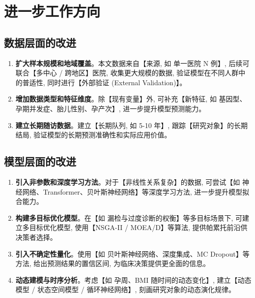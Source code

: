 
\section{进一步工作方向}

\subsection{数据层面的改进}

\begin{enumerate}
  \item \textbf{扩大样本规模和地域覆盖}。本文数据来自【来源, 如 单一医院 N 例】, 后续可联合【多中心 / 跨地区】医院, 收集更大规模的数据, 验证模型在不同人群中的普适性, 同时进行【外部验证 (External Validation)】。

  \item \textbf{增加数据类型和特征维度}。除【现有变量】外, 可补充【新特征, 如 基因型、孕期并发症、胎儿性别、孕产次】, 进一步提升模型预测能力。

  \item \textbf{建立长期随访数据}。建立【长期队列, 如 5-10 年】, 跟踪【研究对象】的长期结局, 验证模型的长期预测准确性和实际应用价值。
\end{enumerate}

\subsection{模型层面的改进}

\begin{enumerate}
  \item \textbf{引入非参数和深度学习方法}。对于【非线性关系复杂】的数据, 可尝试【如 神经网络、Transformer、贝叶斯神经网络】等深度学习方法, 进一步提升模型拟合能力。

  \item \textbf{构建多目标优化模型}。在【如 漏检与过度诊断的权衡】等多目标场景下, 可建立多目标优化模型, 使用【NSGA-II / MOEA/D】等算法, 提供帕累托前沿供决策者选择。

  \item \textbf{引入不确定性量化}。使用【如 贝叶斯神经网络、深度集成、MC Dropout】等方法, 给出预测结果的置信区间, 为临床决策提供更全面的信息。

  \item \textbf{动态建模与时序分析}。考虑【如 孕周、BMI 随时间的动态变化】, 建立【动态模型 / 状态空间模型 / 循环神经网络】, 刻画研究对象的动态演化规律。
\end{enumerate}


